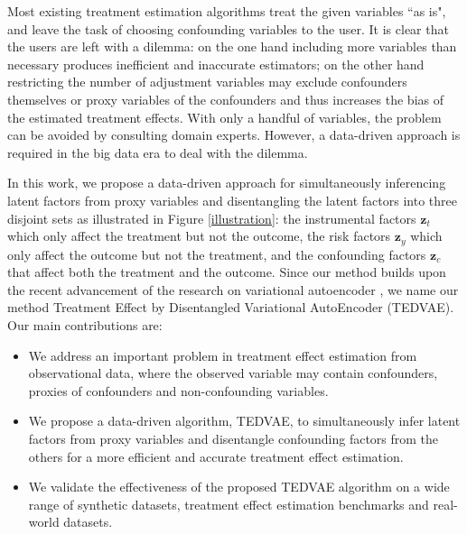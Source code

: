 \documentclass[letterpaper]{article} %
\begin{document}

Most existing treatment estimation algorithms treat the given variables ``as is", and leave the task of choosing confounding variables to the user. 
It is clear that the users are left with a dilemma: on the one hand including more variables than necessary produces inefficient and inaccurate estimators; on the other hand restricting the number of adjustment variables may exclude confounders themselves or proxy variables of the confounders and thus increases the bias of the estimated treatment effects. 
With only a handful of variables, the problem can be avoided by consulting domain experts. 
However, a data-driven approach is required in the big data era to deal with the dilemma.

In this work, we propose a data-driven approach for simultaneously inferencing latent factors from proxy variables and disentangling the latent factors into three disjoint sets as illustrated in Figure \ref{illustration}: the instrumental factors $\mathbf{z}_t$ which only affect the treatment but not the outcome, the risk factors $\mathbf{z}_y$ which only affect the outcome but not the treatment, and the confounding factors $\mathbf{z}_c$ that affect both the treatment and the outcome.
Since our method builds upon the recent advancement of the research on variational autoencoder \cite{Kingma2014}, we name our method Treatment Effect by Disentangled Variational AutoEncoder (TEDVAE).
Our main contributions are:
\begin{itemize}
	\item We address an important problem in treatment effect estimation from observational data, where the observed variable may contain confounders, proxies of confounders and non-confounding variables. 
	\item We propose a data-driven algorithm, TEDVAE, to simultaneously infer latent factors from proxy variables and disentangle confounding factors from the others for a more efficient and accurate treatment effect estimation. 
	\item We validate the effectiveness of the proposed TEDVAE algorithm on a wide range of synthetic datasets, treatment effect estimation benchmarks and real-world datasets. 
\end{itemize}
\end{document}
